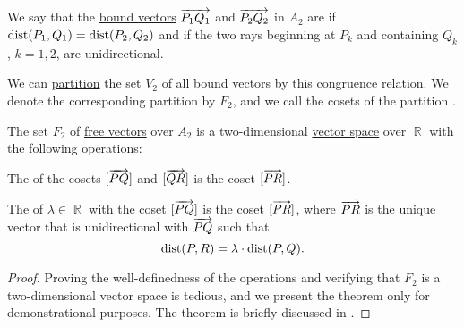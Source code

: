 \begin{definition}\label{def:euclidean_plane_free_vector}\mimprovised
  We say that the \hyperref[def:euclidean_plane/bound_vector]{bound vectors} \( \overrightarrow{P_1 Q_1} \) and \( \overrightarrow{P_2 Q_2} \) in \( A_2 \) are  if \( \operatorname{dist}(P_1, Q_1) = \operatorname{dist}(P_2, Q_2) \) and if the two rays beginning at \( P_k \) and containing \( Q_k \), \( k = 1, 2 \), are unidirectional.

  We can \hyperref[thm:equivalence_partition]{partition} the set \( V_2 \) of all bound vectors by this congruence relation. We denote the corresponding partition by \( F_2 \), and we call the cosets of the partition .
\end{definition}

\begin{theorem}\label{thm:euclidean_plane_vector_factorization}
  The set \( F_2 \) of \hyperref[def:euclidean_plane_free_vector]{free vectors} over \( A_2 \) is a two-dimensional \hyperref[def:vector_space]{vector space} over \( \BbbR \) with the following operations:
  \begin{thmenum}
     The  of the cosets \( [\overrightarrow{PQ}] \) and \( [\overrightarrow{QR}] \) is the coset \( [\overrightarrow{PR}] \).

     The  of \( \lambda \in \BbbR \) with the coset \( [\overrightarrow{PQ}] \) is the coset \( [\overrightarrow{PR}] \), where \( \overrightarrow{PR} \) is the unique vector that is unidirectional with \( \overrightarrow{PQ} \) such that
    \begin{equation*}
      \operatorname{dist}(P, R) = \lambda \cdot \operatorname{dist}(P, Q).
    \end{equation*}
  \end{thmenum}
\end{theorem}
\begin{proof}
  Proving the well-definedness of the operations and verifying that \( F_2 \) is a two-dimensional vector space is tedious, and we present the theorem only for demonstrational purposes. The theorem is briefly discussed in \cite[ch. 1]{ВеселовТроицкий2002Лекции}.
\end{proof}

